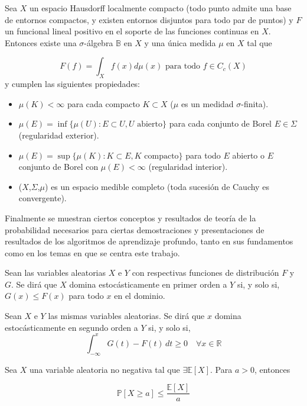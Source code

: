 \begin{teorema}
Sea $X$ un espacio Hausdorff localmente compacto (todo punto admite una base de entornos compactos, y existen entornos disjuntos para todo par de puntos) y $F$ un funcional lineal positivo en el soporte de las funciones continuas en $X$. Entonces existe una $\sigma$-álgebra $\mathbb{B}$ en $X$ y una única medida $\mu$ en $X$ tal que 

$$F(f)=\int_{X} f(x)d\mu(x) \text{ para todo } f \in C_c(X)$$ 
y cumplen las siguientes propiedades:
\begin{itemize}
	\item $\mu(K)<\infty$ para cada compacto $K \subset X$ ($\mu$ es un medidad $\sigma$-finita).
	\item $\mu(E)=\inf\{\mu(U):E\subset U, U\text{ abierto}\}$ para cada conjunto de Borel $E \in \Sigma$ (regularidad exterior).
	\item $\mu(E) = \sup\{\mu(K) : K \subset E, K \text{ compacto}\}$ para todo $E$ abierto o $E$ conjunto de Borel con $\mu(E) < \infty$ (regularidad interior).
	\item ($X$,$\Sigma$,$\mu$) es un espacio medible completo (toda sucesión de Cauchy es convergente).
\end{itemize}
\end{teorema}

Finalmente se muestran ciertos conceptos y resultados de teoría de la probabilidad necesarios para ciertas demostraciones y presentaciones de resultados de los algoritmos de aprendizaje profundo, tanto en sus fundamentos como en los temas en que se centra este trabajo.

\begin{definicion}
Sean las variables aleatorias \(X\) e \(Y\) con respectivas funciones de distribución \(F\) y \(G\). Se dirá que \(X\) domina estocásticamente en primer orden a \(Y\) si, y solo si, \(G(x) \leq F(x)\) para todo \(x\) en el dominio.
\end{definicion}

\begin{definicion}
Sean $X$ e $Y$ las mismas variables aleatorias. Se dirá que $x$ domina estocásticamente en segundo orden a $Y$ si, y solo si, 
\[\int_{-\infty}^{x} G(t) - F(t) \, dt \geq 0 \quad \forall x \in \mathbb{R}\]
\end{definicion}

\begin{proposicion}
Sea \(X\) una variable aleatoria no negativa tal que \(\exists \mathbb{E}[X]\). Para \(a > 0\), entonces

\[
\mathbb{P}[X \geq a] \leq \frac{\mathbb{E}[X]}{a}
\]

\end{proposicion}

